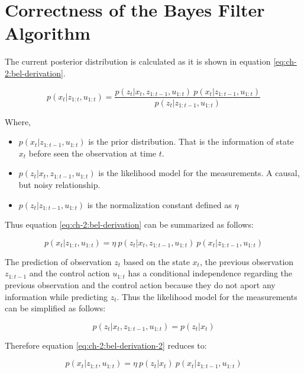 \section{Correctness of the Bayes Filter Algorithm}\label{sec:ap:bayes-filter}
The current posterior distribution is calculated as it is shown in equation \ref{eq:ch-2:bel-derivation}.

\begin{equation}\label{eq:ch-2:bel-derivation}
p(x_t| z_{1:t}, u_{1:t}) = \frac{p(z_t | x_t, z_{1:t-1}, u_{1:t}) \: p(x_t | z_{1:t-1}, u_{1:t})}{p(z_t | z_{1:t-1}, u_{1:t})}
\end{equation}

Where,

\begin{itemize}
\item $p(x_t | z_{1:t-1}, u_{1:t})$ is the prior distribution. That is the information of state $x_t$ before seen the observation at time $t$.
\item $p(z_t | x_t, z_{1:t-1}, u_{1:t})$ is the likelihood model for the measurements. A causal, but noisy relationship\cite{Sarkka:bayesian-filters}. 
\item $p(z_t | z_{1:t-1}, u_{1:t})$ is the normalization constant defined as $\eta$
\end{itemize}

Thus equation \ref{eq:ch-2:bel-derivation} can be summarized as follows:

\begin{equation} \label{eq:ch-2:bel-derivation-2}
p(x_t| z_{1:t}, u_{1:t}) = \eta \: p(z_t | x_t, z_{1:t-1}, u_{1:t}) \: p(x_t | z_{1:t-1}, u_{1:t})
\end{equation}

The prediction of observation $z_t$ based on the state $x_t$, the previous observation $z_{1:t-1}$ and the control action $u_{1:t}$ has a conditional independence regarding the previous observation and the control action because they do not aport any information while predicting $z_t$. Thus the likelihood model for the measurements can be simplified as follows:

\begin{equation}
p(z_t | x_t, z_{1:t-1}, u_{1:t}) = p(z_t | x_t)
\end{equation}

Therefore equation \ref{eq:ch-2:bel-derivation-2} reduces to:

\begin{equation} \label{eq:ch-2:bel-derivation-3}
p(x_t| z_{1:t}, u_{1:t}) = \eta \: p(z_t | x_t) \: p(x_t | z_{1:t-1}, u_{1:t})
\end{equation}

